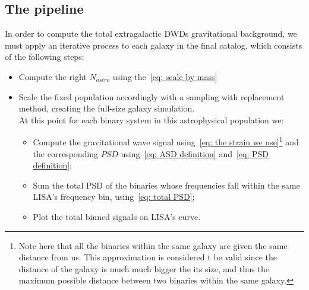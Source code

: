 \subsection{The pipeline}
In order to compute the total extragalactic DWDs gravitational background, we must apply an iterative process to each galaxy in the final catalog, which consists of the following steps:
\begin{itemize}
    \item Compute the right $N_{astro}$ using the~\eqref{eq: scale by mass}
    \item Scale the fixed population accordingly with a sampling with replacement method, creating the full-size galaxy simulation.
    \vspace{1.5mm}\\
    At this point for each binary system in this astrophysical population we:
    \begin{itemize}
        \item Compute the gravitational wave signal using~\eqref{eq: the strain we use}\footnote{Note here that all the binaries within the same galaxy are given the same distance from us. This approximation is considered t be valid since the distance of the galaxy is much much bigger the its size, and thus the maximum possible distance between two binaries within the same galaxy.} and the corresponding $PSD$ using~\eqref{eq: ASD definition} and~\eqref{eq: PSD definition};
        \item Sum the total PSD of the binaries whose frequencies fall within the same LISA's frequency bin, using~\eqref{eq: total PSD};
        \item Plot the total binned signals on LISA's curve.
    \end{itemize}
\end{itemize}
